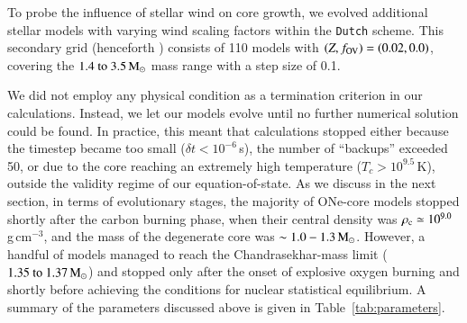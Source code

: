 \documentclass[main.tex]{subfiles}
\begin{document}
To probe the influence of stellar wind on core growth, we  evolved additional stellar models with varying wind scaling factors within the \texttt{Dutch} scheme. This secondary grid (henceforth \seriestwo) consists of 110 models with $(Z,f_{\rm OV})=(0.02,0.0)$, covering the $\numrange{1.4}{3.5}\msun$  mass range with a step size of 0.1\msun. 

We did not employ any physical condition as a termination
criterion in our calculations. Instead, we let our models evolve until 
no further numerical solution could be found. In practice, this meant 
that calculations stopped either because the timestep became too small 
($\delta t <10^{-6}$\,s), the number of \mesa ``backups'' exceeded 50, 
or due to the core reaching an extremely high temperature 
($T_{c}>10^{9.5}$\,K), outside the validity regime of our 
equation-of-state. As we discuss in the next section, in terms of evolutionary stages, the majority of ONe-core models stopped shortly after the carbon burning phase, when 
their central density was $\rho_{\mathrm{c}} \simeq  10^{9.0}$\,g\,cm$^{-3}$, and the mass of the degenerate core was $\sim 1.0-1.3\mathrm{\,M_\odot}$. However, a handful of models  managed to reach the Chandrasekhar-mass limit ($\numrange{1.35}{1.37}\msun$) and stopped only after the onset of 
explosive oxygen burning and shortly before achieving the conditions for nuclear statistical equilibrium. A summary of the parameters discussed above is given in Table~\ref{tab:parameters}.   
\end{document}
